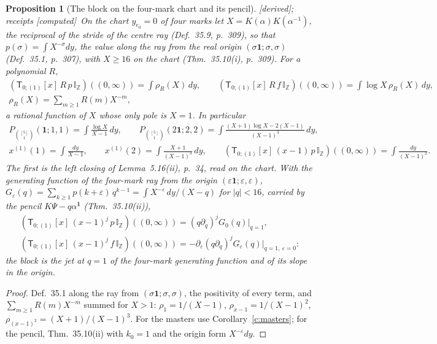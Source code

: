 \documentclass[11pt]{article}
\newcommand{\one}{\mathbf 1}
\newcommand{\sT}{\mathsf T}
\newcommand{\IZ}{\mathbb I_{\mathbb Z}}
\newcommand{\Tx}[3]{(\sT_{#1;(1)}[x]\,#2)((#3,\infty))}
\theoremstyle{plain}
\newtheorem{proposition}{Proposition}[section]
\theoremstyle{definition}
\theoremstyle{remark}
\newcommand{\derived}{\textup{[derived]}}
\newcommand{\computed}{\textup{[computed]}}
\begin{document}
\begin{proposition}[The block on the four-mark chart and its pencil]\label{p:chart}\derived; receipts \computed\
On the chart $y_{e_0}=0$ of four marks let $X=K(\alpha)K(\alpha^{-1})$, the reciprocal of the stride of the centre ray (Def.~35.9, p.~309), so that $p(\sigma)=\int X^{-\sigma}dy$, the value along the ray from the real origin $(\sigma\one;\sigma,\sigma)$ (Def.~35.1, p.~307), with $X\ge16$ on the chart (Thm.~35.10(i), p.~309). For a polynomial $R$,
\begin{gather*}
\Tx{0}{R\,p\,\IZ}{0}=\int\rho_R(X)\,dy,\qquad\Tx{0}{R\,f\,\IZ}{0}=\int\log X\,\rho_R(X)\,dy,\\
\rho_R(X)=\sum_{m\ge1}R(m)X^{-m},
\end{gather*}
a rational function of $X$ whose only pole is $X=1$. In particular
\begin{gather*}
P_{\binom{[5]}1}(\one;1,1)=\int\frac{\log X}{X-1}\,dy,\qquad P_{\binom{[5]}1}(2\one;2,2)=\int\frac{(X+1)\log X-2(X-1)}{(X-1)^3}\,dy,\\
x^{(1)}(1)=\int\frac{dy}{X-1},\qquad x^{(1)}(2)=\int\frac{X+1}{(X-1)^3}\,dy,\qquad \Tx{0}{(x-1)\,p\,\IZ}{0}=\int\frac{dy}{(X-1)^2}.
\end{gather*}
The first is the left closing of Lemma~5.16(ii), p.~34, read on the chart. With the generating function of the four-mark ray from the origin $(\varepsilon\one;\varepsilon,\varepsilon)$, $G_\varepsilon(q)=\sum_{k\ge1}p(k+\varepsilon)\,q^{k-1}=\int X^{-\varepsilon}\,dy/(X-q)$ for $|q|<16$, carried by the pencil $K\Psi-q\alpha^{\one}$ (Thm.~35.10(ii)),
\begin{gather*}
\Tx{0}{(x-1)^j\,p\,\IZ}{0}=(q\partial_q)^jG_0(q)\big|_{q=1},\\
\Tx{0}{(x-1)^j\,f\,\IZ}{0}=-\partial_\varepsilon(q\partial_q)^jG_\varepsilon(q)\big|_{q=1,\ \varepsilon=0}:
\end{gather*}
the block is the jet at $q=1$ of the four-mark generating function and of its slope in the origin.
\end{proposition}

\begin{proof}
Def.~35.1 along the ray from $(\sigma\one;\sigma,\sigma)$, the positivity of every term, and $\sum_{m\ge1}R(m)X^{-m}$ summed for $X>1$: $\rho_1=1/(X-1)$, $\rho_{x-1}=1/(X-1)^2$, $\rho_{(x-1)^2}=(X+1)/(X-1)^3$. For the masters use Corollary~\ref{c:masters}; for the pencil, Thm.~35.10(ii) with $k_0=1$ and the origin form $X^{-\varepsilon}dy$.
\end{proof}
\end{document}
